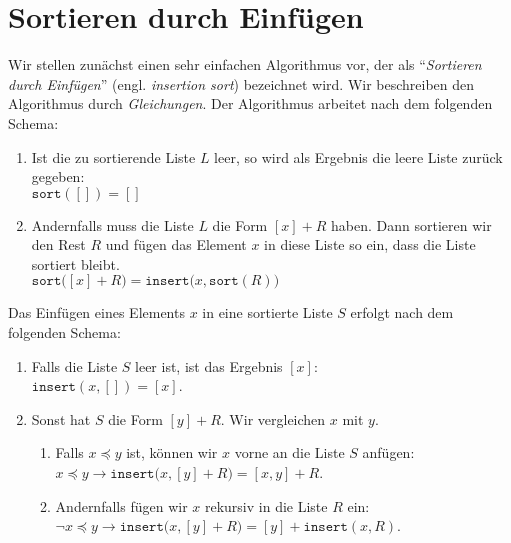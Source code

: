 \section{Sortieren durch Einf\"ugen}
Wir stellen zun\"achst einen sehr einfachen Algorithmus vor, der als 
``\emph{Sortieren durch Einf\"ugen}'' (engl. \emph{insertion sort}) bezeichnet wird.
Wir beschreiben den Algorithmus durch \emph{Gleichungen}.
Der Algorithmus arbeitet nach dem folgenden Schema:
\begin{enumerate}
\item Ist die zu sortierende Liste $L$ leer, so wird als Ergebnis
      die leere Liste zur\"uck gegeben: \\[0.2cm]
      \hspace*{1.3cm} $\mathtt{sort}([]) = []$
\item Andernfalls muss die Liste $L$ die Form $[x] + R$ haben.
      Dann sortieren wir den Rest $R$ und f\"ugen das Element $x$ in diese Liste so ein,
      dass die Liste sortiert bleibt. \\[0.2cm]
      \hspace*{1.3cm} $\mathtt{sort}\bigl([x] + R\bigr) = \mathtt{insert}\bigl(x, \mathtt{sort}(R)\bigr)$
\end{enumerate}
Das Einf\"ugen eines Elements $x$ in eine sortierte Liste $S$ erfolgt nach dem folgenden Schema:
\begin{enumerate}
\item Falls die Liste $S$ leer ist, ist das Ergebnis $[x]$: \\[0.2cm]
      \hspace*{1.3cm} $\mathtt{insert}(x,[]) = [x]$.
\item Sonst hat $S$ die Form $[y] + R$.  Wir vergleichen $x$ mit $y$.
      \begin{enumerate}
      \item Falls $x \preceq y$ ist, k\"onnen wir $x$ vorne an die Liste $S$ anf\"ugen: \\[0.2cm]
            \hspace*{1.3cm} $x \preceq y \rightarrow \mathtt{insert}\bigl(x, [y] + R\bigr) = [x,y] + R$. 
      \item Andernfalls f\"ugen wir $x$ rekursiv in die Liste $R$ ein: \\[0.2cm]
            \hspace*{1.3cm} $\neg x \preceq y \rightarrow \mathtt{insert}\bigl(x, [y] + R\bigr) = [y] + \mathtt{insert}(x,R)$. 
      \end{enumerate}
\end{enumerate}
